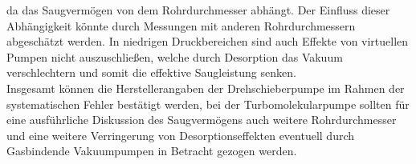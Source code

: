 da das Saugvermögen von dem Rohrdurchmesser abhängt. Der Einfluss dieser Abhängigkeit könnte 
durch Messungen mit anderen Rohrdurchmessern abgeschätzt werden. In niedrigen Druckbereichen sind auch 
Effekte von virtuellen Pumpen nicht auszuschließen, welche durch Desorption das Vakuum verschlechtern 
und somit die effektive Saugleistung senken. 
\\
Insgesamt können die Herstellerangaben der Drehschieberpumpe im Rahmen der systematischen Fehler 
bestätigt werden, bei der Turbomolekularpumpe sollten für eine ausführliche Diskussion des 
Saugvermögens auch weitere Rohrdurchmesser und eine weitere Verringerung von Desorptionseffekten 
eventuell durch Gasbindende Vakuumpumpen in Betracht gezogen werden.
\newpage